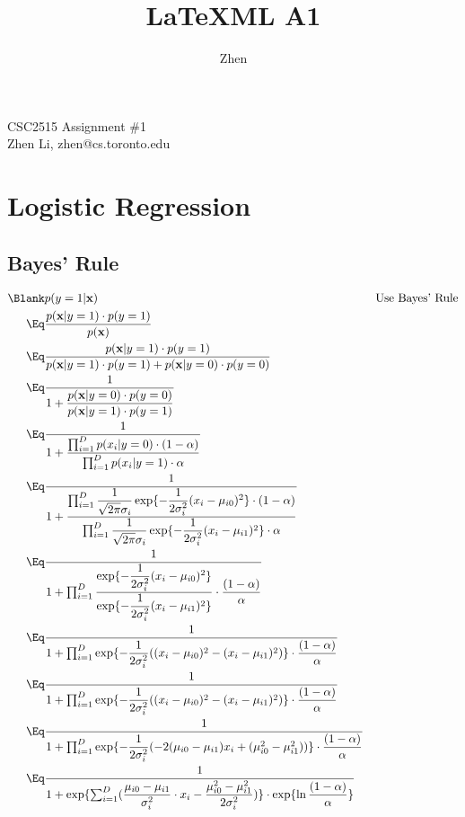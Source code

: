 \documentclass{article}
\title{\LaTeX ML A1}
\author{Zhen}
\begin{document}
\begin{center}
\Huge CSC2515 Assignment \#1 \\ 
\Large Zhen Li, zhen@cs.toronto.edu
\end{center}

\section{Logistic Regression}

\subsection{Bayes' Rule}

\begin{align*}
\Blank & p(y=1 | \mathbf{x}) && \text{Use Bayes' Rule}\\
\Eq & \frac{p(\mathbf{x} | y=1) \cdot p(y=1)}{p(\mathbf{x})}\\
\Eq & \frac{p(\mathbf{x} | y=1) \cdot p(y=1)}{p(\mathbf{x} | y=1) \cdot p(y=1) + p(\mathbf{x} | y=0) \cdot p(y=0)}\\
\Eq & \frac{1}{1 + \dfrac{p(\mathbf{x} | y=0) \cdot p(y=0)}{p(\mathbf{x} | y=1) \cdot p(y=1)}}\\
\Eq & \frac{1}{1 + \dfrac{\prod_{i=1}^{D} p(x_i | y=0) \cdot (1-\alpha)}{\prod_{i=1}^{D} p(x_i | y=1) \cdot \alpha}}\\
\Eq & \frac{1}{1 + \dfrac{\prod_{i=1}^{D} \dfrac{1}{\sqrt{2\pi}\sigma_i} \exp\{-\dfrac{1}{2\sigma_i^2} (x_i-\mu_{i0})^2\} \cdot (1-\alpha)}{\prod_{i=1}^{D} \dfrac{1}{\sqrt{2\pi}\sigma_i} \exp\{-\dfrac{1}{2\sigma_i^2} (x_i-\mu_{i1})^2\} \cdot \alpha}}\\
\Eq & \frac{1}{1 + \prod_{i=1}^{D} \dfrac{\exp\{-\dfrac{1}{2\sigma_i^2} (x_i-\mu_{i0})^2\}}{\exp\{-\dfrac{1}{2\sigma_i^2} (x_i-\mu_{i1})^2\}} \cdot \dfrac{(1-\alpha)}{\alpha}}\\
\Eq & \frac{1}{1 + \prod_{i=1}^{D} \exp\{-\dfrac{1}{2\sigma_i^2} ( (x_i-\mu_{i0})^2 - (x_i-\mu_{i1})^2 )\} \cdot \dfrac{(1-\alpha)}{\alpha}}\\
\Eq & \frac{1}{1 + \prod_{i=1}^{D} \exp\{-\dfrac{1}{2\sigma_i^2} ( (x_i-\mu_{i0})^2 - (x_i-\mu_{i1})^2 )\} \cdot \dfrac{(1-\alpha)}{\alpha}}\\
\Eq & \frac{1}{1 + \prod_{i=1}^{D} \exp\{-\dfrac{1}{2\sigma_i^2} ( -2(\mu_{i0} - \mu_{i1})x_i + (\mu_{i0}^2 - \mu_{i1}^2) )\} \cdot \dfrac{(1-\alpha)}{\alpha}}\\
\Eq & \frac{1}{1 + \exp\{ \sum_{i=1}^{D}  ( \dfrac{\mu_{i0} - \mu_{i1}}{\sigma_i^2} \cdot x_i - \dfrac{\mu_{i0}^2 - \mu_{i1}^2}{2\sigma_i^2} ) \} \cdot \exp\{ \ln\dfrac{(1-\alpha)}{\alpha} \}  }
\end{align*}
\end{document}
